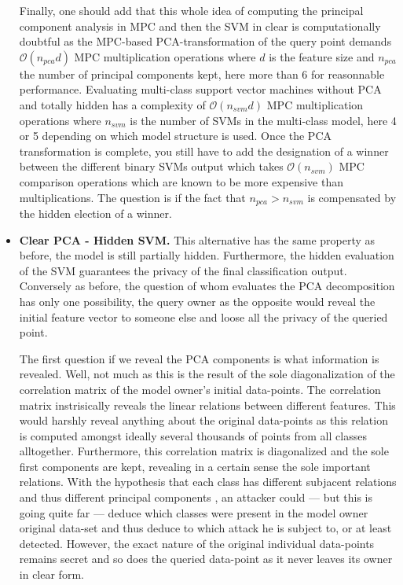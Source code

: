 \begin{itemize}
    Finally, one should add that this whole idea of computing the principal component analysis in MPC and then the SVM in clear is computationally doubtful as the MPC-based PCA-transformation of the query point demands $\mathcal{O}\left(n_{pca}d\right)$ MPC multiplication operations where $d$ is the feature size and $n_{pca}$ the number of principal components kept, here more than 6 for reasonnable performance. Evaluating multi-class support vector machines without PCA and totally hidden has a complexity of $\mathcal{O}(n_{svm}d)$ MPC multiplication operations where $n_{svm}$ is the number of SVMs in the multi-class model, here 4 or 5 depending on which model structure is used. Once the PCA transformation is complete, you still have to add the designation of a winner between the different binary SVMs output which takes $\mathcal{O}(n_{svm})$ MPC comparison operations which are known to be more expensive than multiplications. The question is if the fact that $n_{pca} > n_{svm}$ is compensated by the hidden election of a winner.
    
    \item \textbf{Clear PCA - Hidden SVM.}
    This alternative has the same property as before, the model is still partially hidden. Furthermore, the hidden evaluation of the SVM guarantees the privacy of the final classification output. Conversely as before, the question of whom evaluates the PCA decomposition has only one possibility, the query owner as the opposite would reveal the initial feature vector to someone else and loose all the privacy of the queried point.
    
    The first question if we reveal the PCA components is what information is revealed. Well, not much as this is the result of the sole diagonalization of the correlation matrix of the model owner's initial data-points. The correlation matrix instrisically reveals the linear relations between different features. This would harshly reveal anything about the original data-points as this relation is computed amongst ideally several thousands of points from all classes alltogether. Furthermore, this correlation matrix is diagonalized and the sole first components are kept, revealing in a certain sense the sole important relations. With the hypothesis that each class has different subjacent relations and thus different principal components , an attacker could --- but this is going quite far --- deduce which classes were present in the model owner original data-set and thus deduce to which attack he is subject to, or at least detected. However, the exact nature of the original individual data-points remains secret and so does the queried data-point as it never leaves its owner in clear form.
    

\end{itemize}
